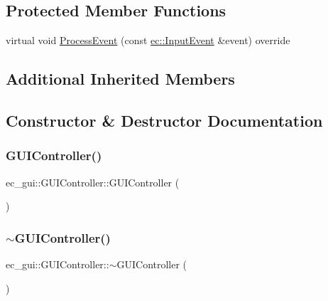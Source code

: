 \subsection*{Protected Member Functions}
\begin{DoxyCompactItemize}
\item 
virtual void \mbox{\hyperlink{classec__gui_1_1_g_u_i_controller_a3d9e413ddf78d41e929ec652c5409f3c}{Process\+Event}} (const \mbox{\hyperlink{structec_1_1_input_event}{ec\+::\+Input\+Event}} \&event) override
\end{DoxyCompactItemize}
\subsection*{Additional Inherited Members}


\subsection{Constructor \& Destructor Documentation}
\mbox{\label{classec__gui_1_1_g_u_i_controller_aca15c08ca8cc2437e6c563e51eaf3a64}} 
\subsubsection{\texorpdfstring{G\+U\+I\+Controller()}{GUIController()}}
{\footnotesize\ttfamily ec\+\_\+gui\+::\+G\+U\+I\+Controller\+::\+G\+U\+I\+Controller (\begin{DoxyParamCaption}{ }\end{DoxyParamCaption})\hspace{0.3cm}{\ttfamily [explicit]}}

\mbox{\label{classec__gui_1_1_g_u_i_controller_ada2d56355a38d965097aefaba51e330a}} 
\subsubsection{\texorpdfstring{$\sim$\+G\+U\+I\+Controller()}{~GUIController()}}
{\footnotesize\ttfamily ec\+\_\+gui\+::\+G\+U\+I\+Controller\+::$\sim$\+G\+U\+I\+Controller (\begin{DoxyParamCaption}{ }\end{DoxyParamCaption})}



